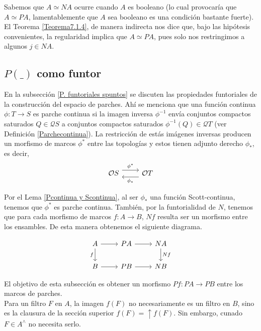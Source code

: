 Sabemos que $A\simeq NA$ ocurre cuando $A$ es booleano (lo cual provocaría que $A\simeq PA$, lamentablemente que $A$ sea booleano es una condición bastante fuerte). El Teorema \ref{Teorema7.1.4}, de manera indirecta nos dice que, bajo las hipótesis convenientes, la regularidad implica que $A\simeq PA$, pues solo nos restringimos a algunos $j\in NA$.

\subsection{$P( \_ )$ como funtor}

En la subsección \ref{P. funtoriales spuntos} se discuten las propiedades funtoriales de la construcción del espacio de parches. Ahí se menciona que una función continua $\phi\colon T\to S$ es parche continua si la imagen inversa $\phi^{-1}$ envía conjuntos compactos saturados $Q\in \mathcal{Q}S$ a conjuntos compactos saturados $\phi^{-1}(Q)\in \mathcal{Q}T$ (ver Definición \ref{Parchecontinua}). La restricción de estás imágenes inversas producen un morfismo de marcos $\phi^*$ entre las topologías y estos tienen adjunto derecho $\phi_*$, es decir,
\[\begin{tikzcd}
	{\mathcal{O}S} & {\mathcal{O}T}
	\arrow["{\phi^*}", shift left=2, from=1-1, to=1-2]
	\arrow["{\phi_*}", shift left=2, from=1-2, to=1-1]
\end{tikzcd}\]

Por el Lema \ref{Pcontinua y Scontinua}, al ser $\phi_*$ una función Scott-continua, tenemos que $\phi^*$ es parche continua. También, por la funtorialidad de $N$, tenemos que para cada morfismo de marcos $f\colon A\to B$, $Nf$ resulta ser un morfismo entre los ensambles. De esta manera obtenemos el siguiente diagrama.

\[\begin{tikzcd}
	A & PA & NA \\
	B & PB & NB
	\arrow[from=1-1, to=1-2]
	\arrow["f"', from=1-1, to=2-1]
	\arrow[from=1-2, to=1-3]
	\arrow["Nf", from=1-3, to=2-3]
	\arrow[from=2-1, to=2-2]
	\arrow[from=2-2, to=2-3]
\end{tikzcd}\]

El objetivo de esta subsección es obtener un morfismo $Pf\colon PA\to PB$ entre los marcos de parches.\\

Para un filtro $F$ en $A$, la imagen $f(F)$ no necesariamente es un filtro en $B$, sino es la clausura de la sección superior $f(F)=\uparrow f(F)$. Sin embargo, cunado $F\in A^\wedge$ no necesita serlo.\\

